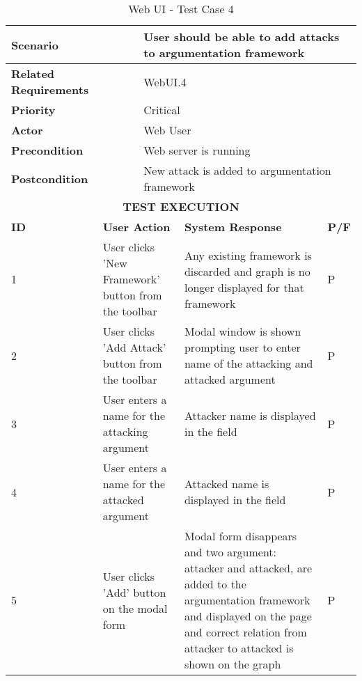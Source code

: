 \begin{longtable}[c]{p{}|p{}|p{}|p{}|p{}}
	\caption{Web UI - Test Case 4}
	\label{table:testcase4} \\
	\hline
	\multicolumn{2}{p{0.3\textwidth}}{\textbf{Scenario}} & \multicolumn{3}{p{0.7\textwidth}}{User should be able to add attacks to argumentation framework} \\ 
	\hline
	\endfirsthead
	\endhead
	\multicolumn{2}{p{0.4\textwidth}}{\textbf{Related Requirements}} & \multicolumn{3}{p{0.6\textwidth}}{WebUI.4} \\ 
	\hline
	\multicolumn{2}{p{0.4\textwidth}}{\textbf{Priority}} & \multicolumn{3}{p{0.6\textwidth}}{Critical} \\ 
	\hline
	\multicolumn{2}{p{0.3\textwidth}}{\textbf{Actor}} & \multicolumn{3}{p{0.7\textwidth}}{Web User} \\ 
	\hline
	\multicolumn{2}{p{0.3\textwidth}}{\textbf{Precondition}} & \multicolumn{3}{p{0.7\textwidth}}{Web server is running} \\ 
	\hline
	\multicolumn{2}{p{0.3\textwidth}}{\textbf{Postcondition}} & \multicolumn{3}{p{0.7\textwidth}}{New attack is added to argumentation framework} \\ 
	\hline
	\multicolumn{5}{c}{\cellcolor{grey}\textbf{TEST EXECUTION}} \\ 
	\hline
	\textbf{ID} & \multicolumn{2}{|p{0.4\textwidth}|}{\textbf{User Action}} & \textbf{System Response} & \textbf{P/F} \\ 
	\hline
	1 & \multicolumn{2}{|p{0.4\textwidth}|}{User clicks 'New Framework' button from the toolbar} & Any existing framework is discarded and graph is no longer displayed for that framework & P \\ 
	\hline
	2 & \multicolumn{2}{|p{0.4\textwidth}|}{User clicks 'Add Attack' button from the toolbar} & Modal window is shown prompting user to enter name of the attacking and attacked argument & P \\ 
	\hline
	3 & \multicolumn{2}{|p{0.4\textwidth}|}{User enters a name for the attacking argument} & Attacker name is displayed in the field & P \\ 
	\hline
	4 & \multicolumn{2}{|p{0.4\textwidth}|}{User enters a name for the attacked argument} & Attacked name is displayed in the field & P \\ 
	\hline
	5 & \multicolumn{2}{|p{0.4\textwidth}|}{User clicks 'Add' button on the modal form} & Modal form disappears and two argument: attacker and attacked, are added to the argumentation framework and displayed on the page and correct relation from attacker to attacked is shown on the graph & P \\ 
	\hline
\end{longtable}


